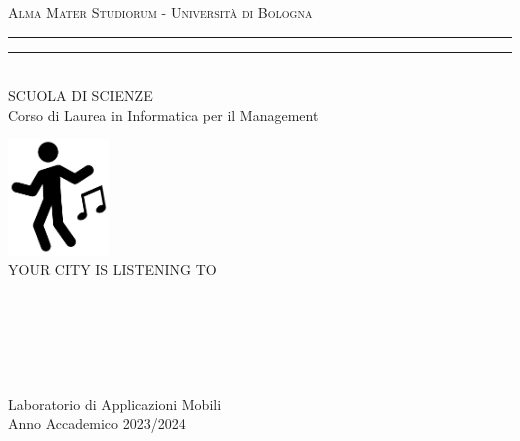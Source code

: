 \documentclass{article}
\begin{document}
\pagestyle{empty}


\begin{titlepage} 
    \begin{center}
        {{\Large{\textsc{Alma Mater Studiorum - Università di Bologna}}}}
        \rule[0.1cm]{\textwidth}{0.1px}
        \rule[0.5cm]{\textwidth}{0.6px}\\
        {\large{SCUOLA DI SCIENZE \\ Corso di Laurea in Informatica per il Management}}
    \end{center}
    
    \vspace{90px}
    
    \begin{center}
        {\includegraphics[width=0.2\textwidth]{logo.png}}\\\vspace*{20pt}
        \LARGE YOUR CITY IS LISTENING TO
    \end{center}
    
    \vspace{100px}
    \par
    \noindent
    \begin{minipage}[t]{0.04\textwidth}
    ~
    \end{minipage}
    \begin{minipage}[t]{0.4\textwidth}
    \end{minipage}
    \hfill
    \begin{minipage}[t]{0.4\textwidth}\raggedleft
        {\fontsize{12}{13}{}\
    }
    \end{minipage}
    \begin{minipage}[t]{0.04\textwidth}
    ~
    \end{minipage}
    
    \vspace*{140px}
    
    \begin{center}
        \large{Laboratorio di Applicazioni Mobili}\\
        \large{Anno Accademico 2023/2024}
    \end{center}
    \end{titlepage}
    
\end{document}
